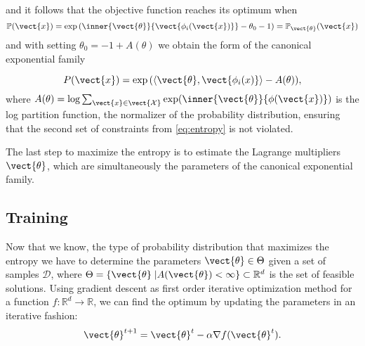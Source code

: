     and it follows that the objective function reaches its optimum when 
    \begin{equation}   
        \mathbb{P}(\vect{x}) = \exp{(\inner{\vect{\theta}}{\vect{\phi_i(\vect{x})}} - \theta_0 - 1)} = \mathbb{P}_{\vect{\theta}}(\vect{x})
    \end{equation} 
    and with setting $\theta_0 = -1 + A(\theta) $ we obtain the form of the canonical exponential family

    \begin{equation}
        P(\vect{x}) = \exp{(\langle\vect{\theta}, \vect{\phi_i(x)} \rangle - A(\theta))},
    \end{equation}
    where $A(\theta) = \log \sum_{\vect{x}\in \vect{\mathcal{X}}} \exp(\inner{\vect{\theta}}{\phi(\vect{x})})$ is the log partition function, the normalizer of the probability distribution, ensuring that the second set of constraints from \autoref{eq:entropy} is not violated.
    
    The last step to maximize the entropy is to estimate the Lagrange multipliers $\vect{\theta}$, which are simultaneously the parameters of the canonical exponential family.

    \subsection{Training}
    \label{ssec:train}

    Now that we know, the type of probability distribution that maximizes the entropy we have to determine the parameters $\vect{\theta} \in \Theta$ given a set of samples $\mathcal{D}$, where $\Theta = \{\vect{\theta} \;\lvert A(\vect{\theta}) < \infty\} \subset \mathbb{R}^d$ is the set of feasible solutions.
    Using gradient descent as first order iterative optimization method for a function $f: \mathbb{R}^d \rightarrow \mathbb{R}$, we can find the optimum by updating the parameters in an iterative fashion:
    \begin{equation}
        \label{eq:gradesc}
        \vect{\theta}^{t+1} = \vect{\theta}^{t} - \alpha \nabla f(\vect{\theta}^{t}).
    \end{equation}

